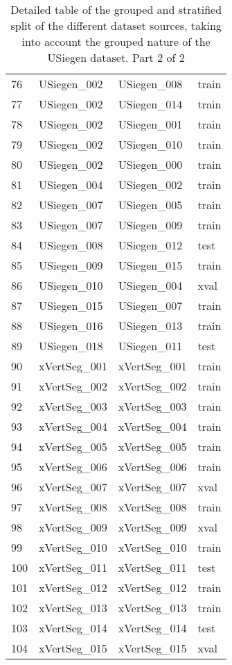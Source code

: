 \begin{SCtable}[\sidecaptionrelwidth][h]
\begin{tabular}{l m{4cm} m{4cm} l}
    76  &       USiegen\_002 &       USiegen\_008 &  train \\
    77  &       USiegen\_002 &       USiegen\_014 &  train \\
    78  &       USiegen\_002 &       USiegen\_001 &  train \\
    79  &       USiegen\_002 &       USiegen\_010 &  train \\
    80  &       USiegen\_002 &       USiegen\_000 &  train \\
    81  &       USiegen\_004 &       USiegen\_002 &  train \\
    82  &       USiegen\_007 &       USiegen\_005 &  train \\
    83  &       USiegen\_007 &       USiegen\_009 &  train \\
    84  &       USiegen\_008 &       USiegen\_012 &   test \\
    85  &       USiegen\_009 &       USiegen\_015 &  train \\
    86  &       USiegen\_010 &       USiegen\_004 &   xval \\
    87  &       USiegen\_015 &       USiegen\_007 &  train \\
    88  &       USiegen\_016 &       USiegen\_013 &  train \\
    89  &       USiegen\_018 &       USiegen\_011 &   test \\
    90  &      xVertSeg\_001 &      xVertSeg\_001 &  train \\
    91  &      xVertSeg\_002 &      xVertSeg\_002 &  train \\
    92  &      xVertSeg\_003 &      xVertSeg\_003 &  train \\
    93  &      xVertSeg\_004 &      xVertSeg\_004 &  train \\
    94  &      xVertSeg\_005 &      xVertSeg\_005 &  train \\
    95  &      xVertSeg\_006 &      xVertSeg\_006 &  train \\
    96  &      xVertSeg\_007 &      xVertSeg\_007 &   xval \\
    97  &      xVertSeg\_008 &      xVertSeg\_008 &  train \\
    98  &      xVertSeg\_009 &      xVertSeg\_009 &   xval \\
    99  &      xVertSeg\_010 &      xVertSeg\_010 &  train \\
    100 &      xVertSeg\_011 &      xVertSeg\_011 &   test \\
    101 &      xVertSeg\_012 &      xVertSeg\_012 &  train \\
    102 &      xVertSeg\_013 &      xVertSeg\_013 &  train \\
    103 &      xVertSeg\_014 &      xVertSeg\_014 &   test \\
    104 &      xVertSeg\_015 &      xVertSeg\_015 &   xval \\
\bottomrule
\end{tabular}
\caption{Detailed table of the grouped and stratified split of the different dataset sources, taking into account the grouped nature of the USiegen dataset. Part 2 of 2}
\end{SCtable}